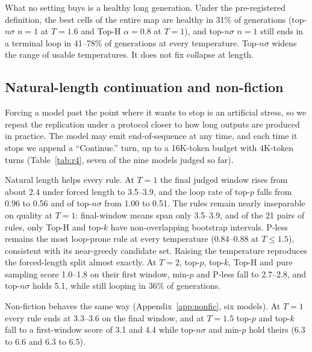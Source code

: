 \documentclass{article}
\newcommand{\pless}{P-less}
\begin{document}
What no setting buys is a healthy long generation. Under the pre-registered definition, the best cells of the entire map are healthy in 31\% of generations (top-$n\sigma$ $n{=}1$ at $T{=}1.6$ and Top-H $\alpha{=}0.8$ at $T{=}1$), and top-$n\sigma$ $n{=}1$ still ends in a terminal loop in 41--78\% of generations at every temperature. Top-$n\sigma$ widens the range of usable temperatures. It does not fix collapse at length.

\subsection{Natural-length continuation and non-fiction}
\label{sec:natural}

Forcing a model past the point where it wants to stop is an artificial stress, so we repeat the replication under a protocol closer to how long outputs are produced in practice. The model may emit end-of-sequence at any time, and each time it stops we append a ``Continue.'' turn, up to a 16K-token budget with 4K-token turns (Table~\ref{tab:r4}, seven of the nine models judged so far).

\begin{table}[t]
\centering
\caption{\textbf{Letting the model stop and continue halves the loop rate of several rules but still does not separate them at $T{=}1$.} Natural-length multi-turn continuation (``Continue.'' after each stop, 16K-token budget), seven models, eight fiction genres, about 42 generations per cell. Columns as in Table~\ref{tab:r1}.}
\label{tab:r4}
\small

\end{table}

Natural length helps every rule. At $T{=}1$ the final judged window rises from about 2.4 under forced length to 3.5--3.9, and the loop rate of top-$p$ falls from 0.96 to 0.56 and of top-$n\sigma$ from 1.00 to 0.51. The rules remain nearly inseparable on quality at $T{=}1$: final-window means span only 3.5--3.9, and of the 21 pairs of rules, only Top-H and top-$k$ have non-overlapping bootstrap intervals. \pless{} remains the most loop-prone rule at every temperature (0.84--0.88 at $T{\le}1.5$), consistent with its near-greedy candidate set. Raising the temperature reproduces the forced-length split almost exactly. At $T{=}2$, top-$p$, top-$k$, Top-H and pure sampling score 1.0--1.8 on their first window, min-$p$ and \pless{} fall to 2.7--2.8, and top-$n\sigma$ holds 5.1, while still looping in 36\% of generations.

Non-fiction behaves the same way (Appendix~\ref{app:nonfic}, six models). At $T{=}1$ every rule ends at 3.3--3.6 on the final window, and at $T{=}1.5$ top-$p$ and top-$k$ fall to a first-window score of 3.1 and 4.4 while top-$n\sigma$ and min-$p$ hold theirs (6.3 to 6.6 and 6.3 to 6.5).
\end{document}
